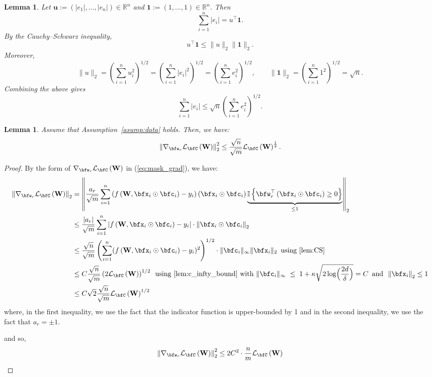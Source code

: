 \documentclass[10pt]{article} %
\newtheorem{lemma}[theorem]{Lemma}
\theoremstyle{definition}
\theoremstyle{plain}
\newcommand{\paren}[1]{\left(#1\right)}
\newcommand{\norm}[1]{\left\|#1\right\|}
\newcommand{\indy}[1]{\mathbb{I}\left\{#1\right\}}
\def\calL{{\mathcal{L}}}
\begin{document}
\begin{lemma}
\label{lem:CS}
Let $\mathbf{u} := (|e_1|, ..., |e_n|)  \in \mathbb{R}^n$ and $\mathbf{1} := (1, ..., 1) \in \mathbb{R}^n.$ Then
\[
\sum_{i=1}^n |e_i|
= u^\top \mathbf{1}.
\]
By the Cauchy--Schwarz inequality,
\[
u^\top \mathbf{1}
\le \|u\|_2  \|\mathbf{1}\|_2.
\]
Moreover,
\[
\|u\|_2
= \left(\sum_{i=1}^n u_i^2\right)^{1/2}
= \left(\sum_{i=1}^n |e_i|^2\right)^{1/2}
= \left(\sum_{i=1}^n e_i^2\right)^{1/2},
\qquad
\|\mathbf{1}\|_2
= \left(\sum_{i=1}^n 1^2\right)^{1/2}
= \sqrt{n}.
\]
Combining the above gives
\[
\sum_{i=1}^n |e_i|
\le
\sqrt{n}\left(\sum_{i=1}^n e_i^2\right)^{1/2}.
\]
\end{lemma}
\begin{lemma}
    \label{lem:general_smoothness}
    Assume that Assumption~\ref{asump:data} holds. Then, we have:
    \[
\norm{\nabla_{\bfw_r}\calL_{\bfC}\paren{\mathbf{W}}}_2^2\leq \frac{\sqrt{n}}{\sqrt{m}}\calL_{\bfC}\paren{\mathbf{W}}^{\frac{1}{2}}.
    \]
\end{lemma}
\begin{proof}
    By the form of $\nabla_{\bfw_r}\calL_{\bfC}\paren{\mathbf{W}}$ in (\ref{eq:mask_grad}), we have:
    \begin{align*}
        \norm{\nabla_{\bfw_r}\calL_{\bfC}\paren{\mathbf{W}}}_2
        & =\norm{\frac{a_r}{\sqrt{m}}\sum_{i=1}^n\paren{f\paren{\mathbf{W},\bfx_i\odot\bfc_i} - y_i} \paren{\bfx_i\odot\bfc_i}\underbrace{\indy{\bfw_r^\top\paren{\bfx_i\odot\bfc_i}\geq 0}}_{\le 1}}_2 \\
        & \leq \frac{\left|a_r\right|}{\sqrt{m}}\sum_{i=1}^n\left|f\paren{\mathbf{W},\bfx_i\odot\bfc_i}-y_i\right|\cdot\norm{\bfx_i\odot\bfc_i}_2\\
        & \leq \frac{\sqrt{n}}{\sqrt{m}}\left(\sum_{i=1}^n (f\paren{\mathbf{W},\bfx_i\odot\bfc_i}-y_i)^2\right)^{1/2} \cdot \|\bfc_i\|_\infty \|\bfx_i\|_2 \enspace \text{using \ref{lem:CS}} \\
        & \leq C \frac{\sqrt{n}}{\sqrt{m}} \left(2\calL_{\bfC}\paren{\mathbf{W}}\right)^{1/2} \enspace \text{using \ref{lem:c_infty_bound} with }\|\bfc_i\|_\infty \;\le\; 1 + \kappa\sqrt{2\log\!\Big(\frac{2d}{\delta}\Big)} = C \enspace \text{and} \enspace \norm{\bfx_i}_2\leq 1\\
        & \leq C\sqrt{2}\frac{\sqrt{n}}{\sqrt{m}}\calL_{\bfC}\paren{\mathbf{W}}^{1/2}
    \end{align*}
    where, in the first inequality, we use the fact that the indicator function is upper-bounded by 1 and in the second inequality, we use the fact that $a_r = \pm 1$.

    and so,
    \begin{align*}
        \norm{\nabla_{\bfw_r}\calL_{\bfC}\paren{\mathbf{W}}}^2_2\leq 2C^2\cdot \frac{n}{m}\calL_{\bfC}\paren{\mathbf{W}}
    \end{align*}
\end{proof}
\end{document}
